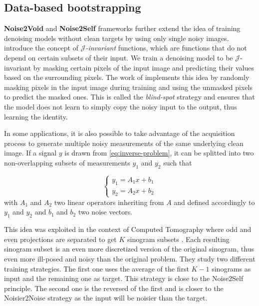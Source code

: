 \subsection{Data-based bootstrapping}


\textbf{Noise2Void} \cite{krull_noise2void_2019} and \textbf{Noise2Self} \cite{batson_noise2self_nodate} frameworks further extend the idea of training denoising models without clean targets by using only single noisy images.
\cite{batson_noise2self_nodate} introduce the concept of \textit{$\mathcal{J}$-invariant} functions, which are functions that do not depend on certain subsets of their input.
We train a denoising model to be $\mathcal{J}$-invariant by masking certain pixels of the input image and predicting their values based on the surrounding pixels.
The work of \cite{krull_noise2void_2019} implements this idea by randomly masking pixels in the input image during training and using the unmasked pixels to predict the masked ones.
This is called the \textit{blind-spot} strategy and ensures that the model does not learn to simply copy the noisy input to the output, thus learning the identity.

In some applications, it is also possible to take advantage of the acquisition process to generate multiple noisy measurements of the same underlying clean image.
If a signal $y$ is drawn from \eqref{eq:inverse-problem}, it can be splitted into two non-overlapping subsets of measurements $y_1$ and $y_2$ such that

\begin{equation}
    \begin{cases}
        y_1 = A_1 x + b_1 \\
        y_2 = A_2 x + b_2
    \end{cases}
\end{equation}
with $A_1$ and $A_2$ two linear operators inheriting from $A$ and defined accordingly to $y_1$ and $y_2$ and $b_1$ and $b_2$ two noise vectors.

This idea was exploited in the context of Computed Tomography where odd and even projections are separated to get $K$ sinogram subsets \cite{hendriksen_noise2inverse_2020}.
Each resulting sinogram subset is an even more discretized version of the original sinogram, thus even more ill-posed and noisy than the original problem.
They study two different training strategies.
The first one uses the average of the first $K-1$ sinograms as input and the remaining one as target. This strategy is close to the Noise2Self principle.
The second one is the reversed of the first and is closer to the Noisier2Noise strategy as the input will be noisier than the target.